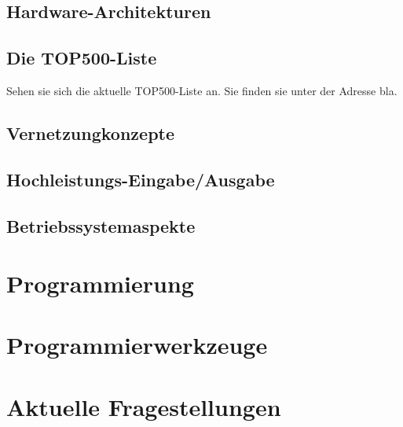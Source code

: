 \documentclass[10pt,oneside,a4paper]{scrartcl}
\begin{document}
\subsection{Hardware-Architekturen}

\subsection{Die TOP500-Liste}
Sehen sie sich die aktuelle TOP500-Liste an. Sie finden sie unter der Adresse  bla.
\subsection{Vernetzungkonzepte}
\subsection{Hochleistungs-Eingabe/Ausgabe}
\subsection{Betriebssystemaspekte}
\section{Programmierung}
\section{Programmierwerkzeuge}
\section{Aktuelle Fragestellungen}
\end{document}
